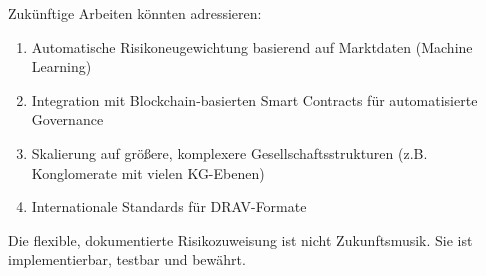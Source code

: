 \documentclass[a4paper,12pt]{article}
\theoremstyle{definition}
\begin{document}
Zukünftige Arbeiten könnten adressieren:
\begin{enumerate}
    \item Automatische Risikoneugewichtung basierend auf Marktdaten (Machine Learning)
    \item Integration mit Blockchain-basierten Smart Contracts für automatisierte Governance
    \item Skalierung auf größere, komplexere Gesellschaftsstrukturen (z.B. Konglomerate mit vielen KG-Ebenen)
    \item Internationale Standards für DRAV-Formate
\end{enumerate}

Die flexible, dokumentierte Risikozuweisung ist nicht Zukunftsmusik. Sie ist implementierbar, testbar und bewährt.


\end{document}
